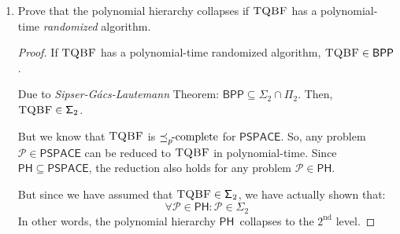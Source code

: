 \documentclass[usletter]{article}
\newcommand {\langset}[1]      {\ensuremath{\mathcal{#1}}}
\newcommand {\machine}[1]      {\ensuremath{\mathscr{#1}}}
\newcommand {\namedlangset}[1] {\ensuremath{\textnormal{\textsc{#1}}}}
\newcommand {\family}[1]       {\ensuremath{\mathsf{#1}}}
\newcommand {\term}[1]      {\textit{#1}}
\newcommand {\namethm}[1]   {\term{#1} Theorem}
\newcommand {\reduce}[2]    {\ensuremath{\preceq_{#1}^{#2}}}
\newcommand {\complete}[2]  {\ensuremath{\reduce{#1}{#2}     %
                                         \hspace*{-4pt}\textnormal{-complete}}}
\newcommand {\PH}     {\family{PH}}
\newcommand {\BPP}    {\family{BPP}}
\newcommand {\PSPACE} {\family{PSPACE}}
\newcommand {\FPi}    {\family{\Pi}}
\newcommand {\FSigma} {\family{\Sigma}}
\begin{document}
\begin{enumerate}[labelsep=2.5em, label=\textbf{\arabic{enumi}}]
\begin{proof}
    Extracting the $i^{th}$ bit of $\machine{R}(\namedlangset{Halt})$ can also
    be achieved in polynomial-time --- we use Chernoff bound to approximate the
    value of $\machine{R}(\namedlangset{Halt})$ to arbitrary precision $\delta$,
    by multiple tosses of the coin. \\
    (Due to lack of time, I could not formalise this part.)

    Thus, given a coin with bias $\machine{R}(\namedlangset{Halt})$,
    we can decide \namedlangset{Halt}, in polynomial-time.
  \end{proof}

  \item Prove that the polynomial hierarchy collapses if \namedlangset{TQBF} has
        a polynomial-time \textit{randomized} algorithm.
  \begin{proof}
    If \namedlangset{TQBF} has a polynomial-time randomized algorithm,
    $\namedlangset{TQBF} \in \BPP$.

    Due to \namethm{Sipser-G\'{a}cs-Lautemann}\cite{Lautemann1983}:
    $\BPP \subseteq \FSigma_2 \cap \FPi_2$.
    Then, $\namedlangset{TQBF} \in \FSigma_2$.

    But we know that \namedlangset{TQBF} is \complete{p}{} for \PSPACE. So, any
    problem $\langset{P} \in \PSPACE$ can be reduced to \namedlangset{TQBF} in
    polynomial-time. Since $\PH \subseteq \PSPACE$, the reduction also holds for
    any problem $\langset{P} \in \PH$.

    But since we have assumed that $\namedlangset{TQBF} \in \FSigma_2$, we have
    actually shown that: \\
    $$ \forall \langset{P} \in \PH: \langset{P} \in \FSigma_2 $$
    In other words, the polynomial hierarchy \PH\ collapses to the $2^\text{nd}$
    level.
  \end{proof}



\end{enumerate}
\end{document}
